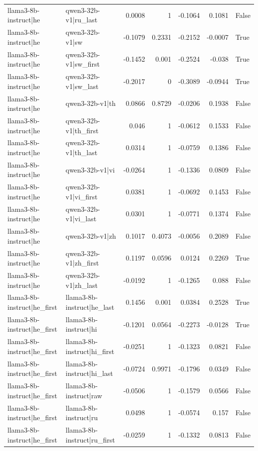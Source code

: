 \begin{table}
\begin{tabular}{l l r r r r l}
llama3-8b-instruct|he & qwen3-32b-v1|ru_last & 0.0008 & 1 & -0.1064 & 0.1081 & False \\
llama3-8b-instruct|he & qwen3-32b-v1|sw & -0.1079 & 0.2331 & -0.2152 & -0.0007 & True \\
llama3-8b-instruct|he & qwen3-32b-v1|sw_first & -0.1452 & 0.001 & -0.2524 & -0.038 & True \\
llama3-8b-instruct|he & qwen3-32b-v1|sw_last & -0.2017 & 0 & -0.3089 & -0.0944 & True \\
llama3-8b-instruct|he & qwen3-32b-v1|th & 0.0866 & 0.8729 & -0.0206 & 0.1938 & False \\
llama3-8b-instruct|he & qwen3-32b-v1|th_first & 0.046 & 1 & -0.0612 & 0.1533 & False \\
llama3-8b-instruct|he & qwen3-32b-v1|th_last & 0.0314 & 1 & -0.0759 & 0.1386 & False \\
llama3-8b-instruct|he & qwen3-32b-v1|vi & -0.0264 & 1 & -0.1336 & 0.0809 & False \\
llama3-8b-instruct|he & qwen3-32b-v1|vi_first & 0.0381 & 1 & -0.0692 & 0.1453 & False \\
llama3-8b-instruct|he & qwen3-32b-v1|vi_last & 0.0301 & 1 & -0.0771 & 0.1374 & False \\
llama3-8b-instruct|he & qwen3-32b-v1|zh & 0.1017 & 0.4073 & -0.0056 & 0.2089 & False \\
llama3-8b-instruct|he & qwen3-32b-v1|zh_first & 0.1197 & 0.0596 & 0.0124 & 0.2269 & True \\
llama3-8b-instruct|he & qwen3-32b-v1|zh_last & -0.0192 & 1 & -0.1265 & 0.088 & False \\
llama3-8b-instruct|he_first & llama3-8b-instruct|he_last & 0.1456 & 0.001 & 0.0384 & 0.2528 & True \\
llama3-8b-instruct|he_first & llama3-8b-instruct|hi & -0.1201 & 0.0564 & -0.2273 & -0.0128 & True \\
llama3-8b-instruct|he_first & llama3-8b-instruct|hi_first & -0.0251 & 1 & -0.1323 & 0.0821 & False \\
llama3-8b-instruct|he_first & llama3-8b-instruct|hi_last & -0.0724 & 0.9971 & -0.1796 & 0.0349 & False \\
llama3-8b-instruct|he_first & llama3-8b-instruct|raw & -0.0506 & 1 & -0.1579 & 0.0566 & False \\
llama3-8b-instruct|he_first & llama3-8b-instruct|ru & 0.0498 & 1 & -0.0574 & 0.157 & False \\
llama3-8b-instruct|he_first & llama3-8b-instruct|ru_first & -0.0259 & 1 & -0.1332 & 0.0813 & False \\

\end{tabular}
\end{table}
